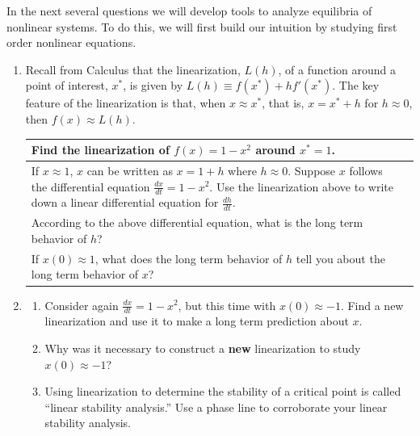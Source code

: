 
In the next several questions we will develop tools to analyze equilibria of nonlinear systems.  To do this, we will first build our intuition by studying first order nonlinear equations.  

\begin{enumerate}[resume]
\item Recall from Calculus that the linearization, $L(h)$, of a function around a point of interest, $x^*$, is given by $L(h) \equiv f(x^*) + hf'(x^*)$. The key feature of the linearization is that, when $x \approx x^*$, that is, $x=x^*+h$ for $h \approx 0$, then $f(x) \approx L(h)$. \label{15problem7}

\begin{tabular}{|p{2.5in}|p{3in}|}
\hline
Find the linearization of $f(x)=1-x^2$ around $x^*=1$. \vspace{1.25in} &  \\ \hline
If $x \approx 1$, $x$ can be written as $x=1+h$ where $h \approx 0$. Suppose $x$ follows the differential equation $\frac{dx}{dt}=1-x^2$. Use the linearization above to write down a linear differential equation for $\frac{dh}{dt}$. \vspace{1.25in} &  \\ \hline
According to the above differential equation, what is the long term behavior of $h$? &  \\ \hline
If $x(0) \approx 1$, what does the long term behavior of $h$ tell you about the long term behavior of $x$? &  \\ \hline
\end{tabular}

\item \label{15problem8}
\begin{enumerate}
\item Consider again $\displaystyle\frac{dx}{dt}=1-x^2$, but this time with $x(0) \approx -1$. Find a new linearization and use it to make a long term prediction about $x$. \label{15problem8parta} \vfill

\clearpage

\item Why was it necessary to construct a \textbf{new} linearization to study $x(0) \approx -1$? \label{15problerm8partb} \vfill

\item Using linearization to determine the stability of a critical point is called ``linear stability analysis.'' Use a phase line to corroborate your linear stability analysis. \label{15problem8partc} \vfill


\end{enumerate}
\end{enumerate}
